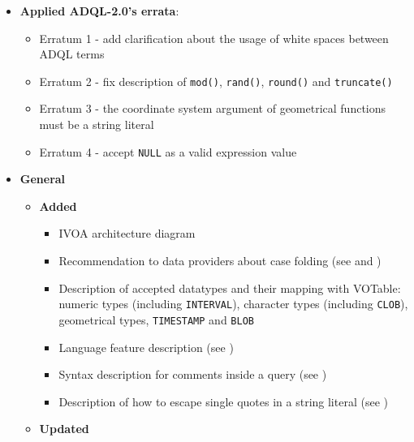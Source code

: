 \documentclass[11pt,a4paper]{ivoa}
\begin{document}
\begin{itemize}
    \item \textbf{Applied ADQL-2.0's errata}:
        \begin{itemize}
            \item Erratum 1 - add clarification about the usage of white spaces
                  between ADQL terms
            \item Erratum 2 - fix description of \verb:mod():, \verb:rand():,
                  \verb:round(): and \verb:truncate():
            \item Erratum 3 - the coordinate system argument of geometrical
                  functions must be a string literal
            \item Erratum 4 - accept \verb:NULL: as a valid expression value
        \end{itemize}
    \item \textbf{General}
        \begin{itemize}
            \item \textbf{Added}
                \begin{itemize}
                    \item IVOA architecture diagram 
                    \item Recommendation to data providers about case folding
                          (see  and
                          )
                    \item Description of accepted datatypes and their mapping
                          with VOTable: numeric types (including
                          \verb:INTERVAL:), character types (including
                          \verb:CLOB:), geometrical types, \verb:TIMESTAMP: and
                          \verb:BLOB: 
                    \item Language feature description
                          (see )
                    \item Syntax description for comments inside a query
                          (see )
                    \item Description of how to escape single quotes in a string
                          literal (see )
                \end{itemize}
            \item \textbf{Updated}
                \begin{itemize}

\end{itemize}
\end{itemize}
\end{itemize}
\end{document}
